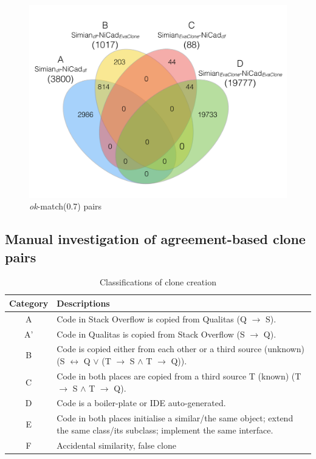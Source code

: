 \documentclass{sig-alternate-05-2015}
\begin{document}
\begin{figure}
		\centering
		\includegraphics[width=0.9\linewidth]{venn4_pairs_ok_pt1+2}
		\caption{\textit{ok}-match(0.7) pairs}
		\label{fig:venn4_orig_ok}
\end{figure}

\subsection{Manual investigation of agreement-based clone pairs}


\begin{table}
	\centering
	\caption{Classifications of clone creation}
	\label{tab:classification_scheme}
	\begin{tabular}{|c|p{13cm}|}
		\hline 
		Category & Descriptions \\ 
		\hline 
		A & Code in Stack Overflow is copied from Qualitas (Q $\rightarrow$ S). \\ 
		\hline 
		A' & Code in Qualitas is copied from Stack Overflow (S $\rightarrow$ Q). \\ 
		\hline 
		B & Code is copied either from each other or a third source (unknown) (S $\leftrightarrow$ Q $\vee$ (T $\rightarrow$ S $\wedge$ T $\rightarrow$ Q)).
		\\ 
		\hline 
		C & Code in both places are copied from a third source T (known) (T $\rightarrow$ S $\wedge$ T $\rightarrow$ Q).
		\\ 
		\hline 
		D & Code is a boiler-plate or IDE auto-generated.
		\\ 
		\hline 
		E & Code in both places initialise a similar/the same object; extend the same class/its subclass; implement the same interface.
		\\ 
		\hline 
		F & Accidental similarity, false clone \\ 
		\hline 
	\end{tabular} 
\end{table}
\end{document}
